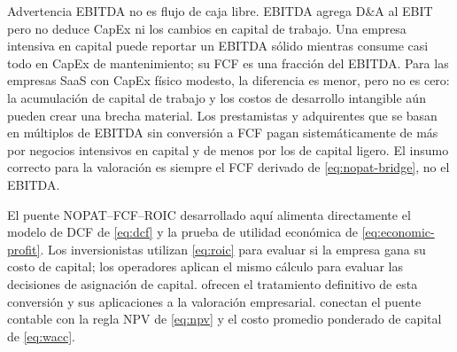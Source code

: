 \begin{admonition}{Advertencia}
EBITDA no es flujo de caja libre. EBITDA agrega D\&A al EBIT pero no deduce CapEx ni los cambios
en capital de trabajo. Una empresa intensiva en capital puede reportar un EBITDA sólido mientras
consume casi todo en CapEx de mantenimiento; su FCF es una fracción del EBITDA. Para las empresas
SaaS con CapEx físico modesto, la diferencia es menor, pero no es cero: la acumulación de capital
de trabajo y los costos de desarrollo intangible aún pueden crear una brecha material. Los
prestamistas y adquirentes que se basan en múltiplos de EBITDA sin conversión a FCF pagan
sistemáticamente de más por negocios intensivos en capital y de menos por los de capital ligero.
El insumo correcto para la valoración es siempre el FCF derivado de \cref{eq:nopat-bridge}, no el
EBITDA.
\end{admonition}

El puente NOPAT--FCF--ROIC desarrollado aquí alimenta directamente el modelo de DCF de
\cref{eq:dcf} y la prueba de utilidad económica de \cref{eq:economic-profit}. Los inversionistas
utilizan \cref{eq:roic} para evaluar si la empresa gana su costo de capital; los operadores aplican
el mismo cálculo para evaluar las decisiones de asignación de capital. \textcite{koller2025valuation}
ofrecen el tratamiento definitivo de esta conversión y sus aplicaciones a la valoración empresarial.
\textcite{brealey2020} conectan el puente contable con la regla NPV de \cref{eq:npv} y el costo
promedio ponderado de capital de \cref{eq:wacc}.
